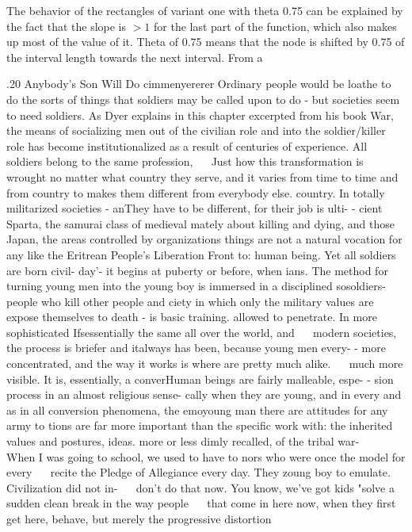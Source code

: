 \documentclass[a4paper,12pt]{amsart}
\begin{document}
The behavior of the rectangles of variant one with theta 0.75 can be explained by the fact that the slope is $>1$ for the last part of the function, which also makes up most of the value of it. Theta of
0.75 means that the node is shifted by 0.75 of the interval length towards the next interval. From a


\newpage

.20
Anybody's Son Will Do
cimmenyererer
Ordinary people would be loathe to do the sorts of things that soldiers may be called upon to do - but societies seem to need soldiers. As Dyer explains in this chapter excerpted from his book War, the means of socializing men out of the civilian role and into the soldier/killer role has become institutionalized as a result of centuries of experience.
All soldiers belong to the same profession, $\quad$ Just how this transformation is wrought no matter what country they serve, and it varies from time to time and from country to makes them different from everybody else. country. In totally militarized societies - anThey have to be different, for their job is ulti- - cient Sparta, the samurai class of medieval mately about killing and dying, and those Japan, the areas controlled by organizations things are not a natural vocation for any like the Eritrean People's Liberation Front to:
human being. Yet all soldiers are born civil- day'- it begins at puberty or before, when ians. The method for turning young men into the young boy is immersed in a disciplined sosoldiers- people who kill other people and ciety in which only the military values are expose themselves to death - is basic training. allowed to penetrate. In more sophisticated Ifsessentially the same all over the world, and $\quad$ modern societies, the process is briefer and
italways has been, because young men every- - more concentrated, and the way it works is where are pretty much alike. $\quad$ much more visible. It is, essentially, a converHuman beings are fairly malleable, espe- - sion process in an almost religious sense-
cally when they are young, and in every and as in all conversion phenomena, the emoyoung man there are attitudes for any army to tions are far more important than the specific work with: the inherited values and postures, ideas. more or less dimly recalled, of the tribal war- $\quad$ When I was going to school, we used to have to
nors who were once the model for every $\quad$ recite the Pledge of Allegiance every day. They zoung boy to emulate. Civilization did not in- $\quad$ don't do that now. You know, we've got kids "solve a sudden clean break in the way people $\quad$ that come in here now, when they first get here, behave, but merely the progressive distortion
\end{document}
